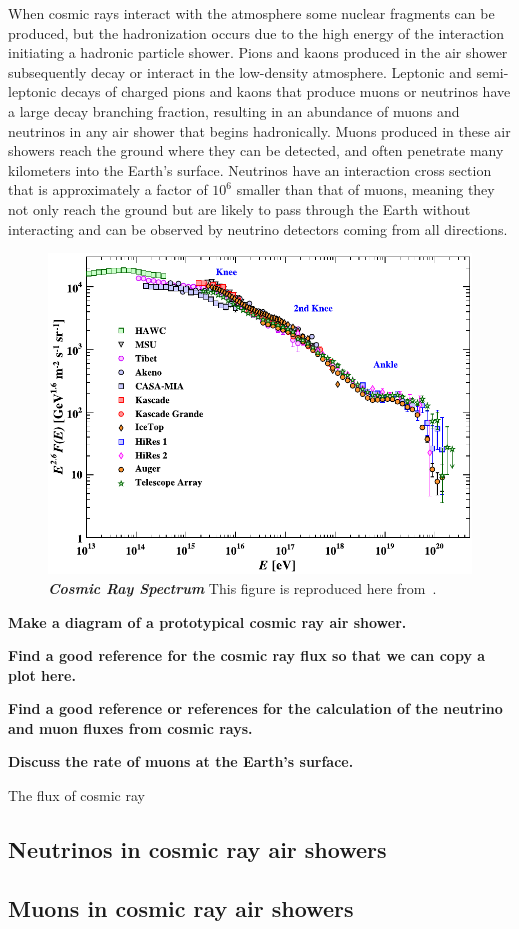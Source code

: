 When cosmic rays interact with the atmosphere some nuclear fragments can be produced, but the hadronization occurs due to the high energy of the interaction initiating a hadronic particle shower.
Pions and kaons produced in the air shower subsequently decay or interact in the low-density atmosphere.
Leptonic and semi-leptonic decays of charged pions and kaons that produce muons or neutrinos have a large decay branching fraction, resulting in an abundance of muons and neutrinos in any air shower that begins hadronically.
Muons produced in these air showers reach the ground where they can be detected, and often penetrate many kilometers into the Earth's surface.
Neutrinos have an interaction cross section that is approximately a factor of $10^6$ smaller than that of muons, meaning they not only reach the ground but are likely to pass through the Earth without interacting and can be observed by neutrino detectors coming from all directions.

\begin{figure}
	\centering
	\includegraphics[width=\linewidth]{figures/cosmic_ray_spectrum}
	\internallinenumbers
	\caption{\textbf{\textit{Cosmic Ray Spectrum}}
	This figure is reproduced here from~\cite{PhysRevD.98.030001}.
	}\label{fig:cosmic_ray_spectrum}
\end{figure}

\textbf{Make a diagram of a prototypical cosmic ray air shower.}

\textbf{Find a good reference for the cosmic ray flux so that we can copy a plot here.}

\textbf{Find a good reference or references for the calculation of the neutrino and muon fluxes from cosmic rays.}

\textbf{Discuss the rate of muons at the Earth's surface.}

The flux of cosmic ray

\subsection{Neutrinos in cosmic ray air showers}

\subsection{Muons in cosmic ray air showers}